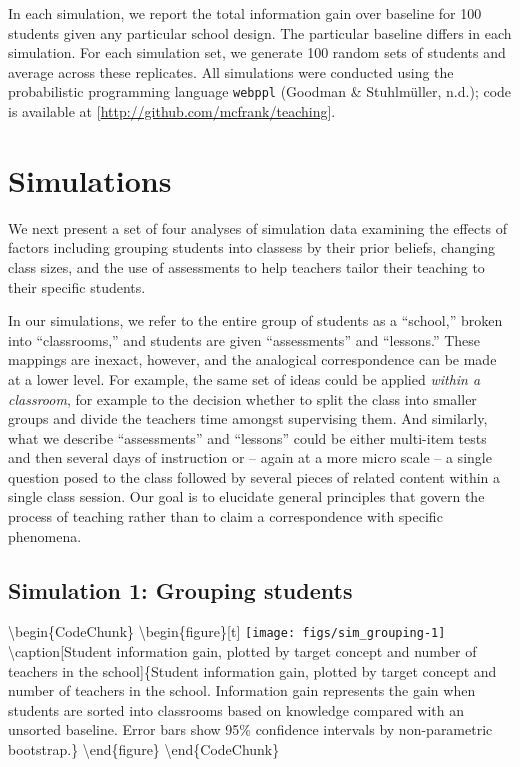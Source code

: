 \documentclass[10pt, letterpaper]{article}
\begin{document}
In each simulation, we report the total information gain over baseline
for 100 students given any particular school design. The particular
baseline differs in each simulation. For each simulation set, we
generate 100 random sets of students and average across these
replicates. All simulations were conducted using the probabilistic
programming language \texttt{webppl} (Goodman \& Stuhlmüller, n.d.);
code is available at {[}\url{http://github.com/mcfrank/teaching}{]}.

\section{Simulations}\label{simulations}

We next present a set of four analyses of simulation data examining the
effects of factors including grouping students into classess by their
prior beliefs, changing class sizes, and the use of assessments to help
teachers tailor their teaching to their specific students.

In our simulations, we refer to the entire group of students as a
``school,'' broken into ``classrooms,'' and students are given
``assessments'' and ``lessons.'' These mappings are inexact, however,
and the analogical correspondence can be made at a lower level. For
example, the same set of ideas could be applied \emph{within a
classroom}, for example to the decision whether to split the class into
smaller groups and divide the teachers time amongst supervising them.
And similarly, what we describe ``assessments'' and ``lessons'' could be
either multi-item tests and then several days of instruction or -- again
at a more micro scale -- a single question posed to the class followed
by several pieces of related content within a single class session. Our
goal is to elucidate general principles that govern the process of
teaching rather than to claim a correspondence with specific phenomena.

\subsection{Simulation 1: Grouping
students}\label{simulation-1-grouping-students}

\textbackslash{}begin\{CodeChunk\}
\textbackslash{}begin\{figure\}{[}t{]}
\texttt{[image: figs/sim\_grouping-1]}
\textbackslash{}caption{[}Student information gain, plotted by target
concept and number of teachers in the school{]}\{Student information
gain, plotted by target concept and number of teachers in the school.
Information gain represents the gain when students are sorted into
classrooms based on knowledge compared with an unsorted baseline. Error
bars show 95\% confidence intervals by non-parametric
bootstrap.\}\label{fig:sim_grouping} \textbackslash{}end\{figure\}
\textbackslash{}end\{CodeChunk\}
\end{document}
